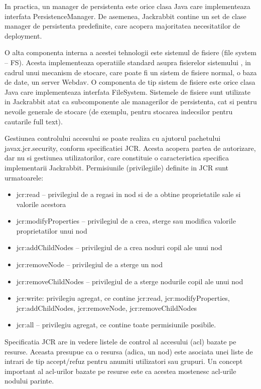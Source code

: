 \documentclass{article}
\begin{document}
In practica, un manager de persistenta este orice clasa Java care implementeaza interfata PersistenceManager. De asemenea, Jackrabbit contine un set de clase manager de persistenta predefinite, care acopera majoritatea necesitatilor de deployment. \ 


\bigskip

O alta componenta interna a acestei tehnologii este sistemul de fisiere (file system -- FS). Acesta implementeaza operatiile standard asupra fisierelor sistemului , in cadrul unui mecanism de stocare, care poate fi un sistem de fisiere normal, o baza de date, un server Webdav. O componenta de tip sistem de fisiere este orice clasa Java care implementeaza interfata FileSystem. Sistemele de fisiere sunt utilizate in Jackrabbit atat ca subcomponente ale managerilor de persistenta, cat si pentru nevoile generale de stocare (de exemplu, pentru stocarea indecsilor pentru cautarile full text). \ 


\bigskip

Gestiunea controlului accesului se poate realiza cu ajutorul pachetului javax.jcr.security, conform specificatiei JCR. Acesta acopera partea de autorizare, dar nu si gestiunea utilizatorilor, care constituie o caracteristica specifica implementarii Jackrabbit. Permisiunile (privilegiile) definite in JCR sunt urmatoarele:

\begin{itemize}
\item jcr:read -- privilegiul de a regasi in nod si de a obtine proprietatile sale si valorile acestora
\item jcr:modifyProperties -- privilegiul de a crea, sterge sau modifica valorile proprietatilor unui nod
\item jcr:addChildNodes -- privilegiul de a crea noduri copil ale unui nod
\item jcr:removeNode -- privilegiul de a sterge un nod
\item jcr:removeChildNodes -- privilegiul de a sterge nodurile copil ale unui nod
\item jcr:write: privilegiu agregat, ce contine jcr:read, jcr:modifyProperties, jcr:addChildNodes, jcr:removeNode, jcr:removeChildNodes
\item jcr:all -- privilegiu agregat, ce contine toate permisiunile posibile.
\end{itemize}

\bigskip

Specificatia JCR are in vedere listele de control al accesului (acl) bazate pe resurse. Aceasta presupue ca o resursa (adica, un nod) este asociata unei liste de intrari de tip accept/refuz pentru anumiti utilizatori sau grupuri. Un concept important al acl-urilor bazate pe resurse este ca acestea mostenesc acl-urile nodului parinte.
\end{document}
